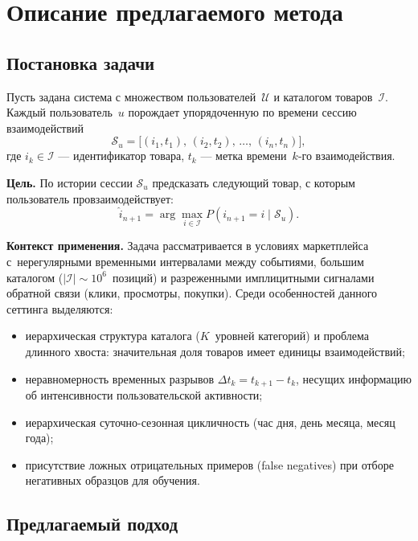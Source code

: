 \chapter{Описание предлагаемого метода}
\label{ch:chapter2}

\section{Постановка задачи}
\label{sec:ch2:problem}

Пусть задана система с множеством пользователей~$\mathcal{U}$ и каталогом товаров~$\mathcal{I}$.
Каждый пользователь~$u$ порождает упорядоченную по времени сессию взаимодействий
\begin{equation}
  \mathcal{S}_u = \bigl[(i_1, t_1),\, (i_2, t_2),\, \ldots,\, (i_n, t_n)\bigr],
\end{equation}
где $i_k \in \mathcal{I}$ --- идентификатор товара, $t_k$ --- метка времени~$k$-го взаимодействия.

\textbf{Цель.} По истории сессии $\mathcal{S}_u$ предсказать следующий товар, с которым пользователь провзаимодействует:
\begin{equation}
  \hat{i}_{n+1} = \arg\max_{i \in \mathcal{I}} P(i_{n+1} = i \mid \mathcal{S}_u).
\end{equation}

\textbf{Контекст применения.} Задача рассматривается в условиях маркетплейса с~нерегулярными
временными интервалами между событиями, большим каталогом ($|\mathcal{I}| \sim 10^6$~позиций) и
разреженными имплицитными сигналами обратной связи (клики, просмотры, покупки). Среди особенностей
данного сеттинга выделяются:
\begin{itemize}
  \item иерархическая структура каталога ($K$~уровней категорий) и проблема длинного хвоста:
        значительная доля товаров имеет единицы взаимодействий;
  \item неравномерность временных разрывов $\Delta t_k = t_{k+1} - t_k$, несущих информацию об
        интенсивности пользовательской активности;
  \item иерархическая суточно-сезонная цикличность (час дня, день месяца, месяц года);
  \item присутствие ложных отрицательных примеров (false negatives) при отборе негативных образцов
        для обучения.
\end{itemize}

\section{Предлагаемый подход}
\label{sec:ch2:method}


